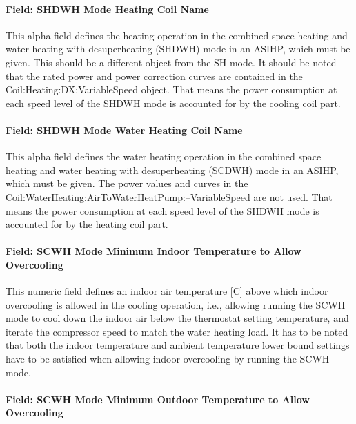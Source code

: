 \paragraph{Field: SHDWH Mode Heating Coil Name}\label{Field-SHDWH-Mode-Heating-Coil-Name-ASIHP}

This alpha field defines the heating operation in the combined space heating and water heating with desuperheating (SHDWH) mode in an ASIHP, which must be given. This should be a different object from the SH mode. It should be noted that the rated power and power correction curves are contained in the Coil:Heating:DX:VariableSpeed object. That means the power consumption at each speed level of the SHDWH mode is accounted for by the cooling coil part.

\paragraph{Field: SHDWH Mode Water Heating Coil Name}\label{Field-SHDWH-Mode-Water-Heating-Coil-Name-ASIHP}

This alpha field defines the water heating operation in the combined space heating and water heating with desuperheating (SCDWH) mode in an ASIHP, which must be given. The power values and curves in the Coil:WaterHeating:AirToWaterHeatPump:--VariableSpeed are not used. That means the power consumption at each speed level of the SHDWH mode is accounted for by the heating coil part.

\paragraph{Field: SCWH Mode Minimum Indoor Temperature to Allow  Overcooling}\label{Field-SCWH-Minimum-In-Overcooling-ASIHP}

This numeric field defines an indoor air temperature [C] above which indoor overcooling is allowed in the cooling operation, i.e., allowing running the SCWH mode to cool down the indoor air below the thermostat setting temperature, and iterate the compressor speed to match the water heating load. It has to be noted that both the indoor temperature and ambient temperature lower bound settings have to be satisfied when allowing indoor overcooling by running the SCWH mode. 


\paragraph{Field: SCWH Mode Minimum Outdoor Temperature to Allow Overcooling}\label{Field-SCWH-Minimum-Outdoor-ASIHP}

